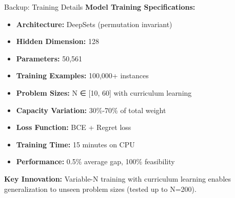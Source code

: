 \documentclass[aspectratio=169]{beamer}
\begin{document}
\begin{frame}{Backup: Training Details}
\textbf{Model Training Specifications:}

\begin{itemize}
    \item \textbf{Architecture:} DeepSets (permutation invariant)
    \item \textbf{Hidden Dimension:} 128
    \item \textbf{Parameters:} 50,561
    \item \textbf{Training Examples:} 100,000+ instances
    \item \textbf{Problem Sizes:} N ∈ [10, 60] with curriculum learning
    \item \textbf{Capacity Variation:} 30\%-70\% of total weight
    \item \textbf{Loss Function:} BCE + Regret loss
    \item \textbf{Training Time:} 15 minutes on CPU
    \item \textbf{Performance:} 0.5\% average gap, 100\% feasibility
\end{itemize}

\vspace{0.3cm}
\textbf{Key Innovation:} Variable-N training with curriculum learning enables generalization to unseen problem sizes (tested up to N=200).
\end{frame}
\end{document}
